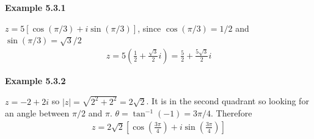\vspace{5mm} 
\textbf{Example 5.3.1} \par

$z = 5[\cos(\pi/3) + i \sin(\pi/3)]$, since $\cos(\pi/3)=1/2$ and $\sin(\pi/3) = \sqrt{3}/2$
\begin{align*}
    z = 5\left(\frac{1}{2} + \frac{\sqrt{3}}{2}i \right) = \frac{5}{2} + \frac{5\sqrt{3}}{2}i
\end{align*}

\vspace{5mm} 
\textbf{Example 5.3.2} \par

$z = -2 + 2i$ so $|z| = \sqrt{2^2 + 2^2} = 2\sqrt{2}$. It is in the second quadrant so looking for an angle between $\pi/2$ and $\pi$. $\theta = \tan^{-1}(-1) = 3\pi/4$. Therefore
\begin{align*}
    z = 2\sqrt{2}\left[\cos\left(\frac{3\pi}{4}\right) + i \sin\left(\frac{3\pi}{4}\right)\right]
\end{align*}